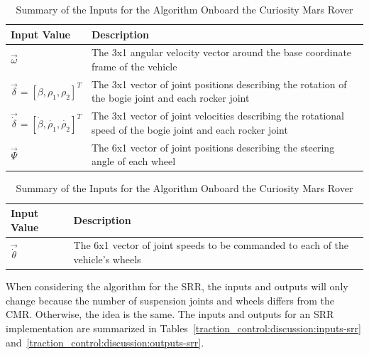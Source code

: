 \begin{table}[H]
	\centering
	\begin{tabular}{| >{\centering\arraybackslash} m{1.2in} | >{\centering\arraybackslash} m{4.5in} |}
		\hline
		\textbf{Input Value} & \textbf{Description} \\
		\hline
		$\vec{\omega}$ & The 3x1 angular velocity vector around the base coordinate frame of the vehicle \\
		\hline
		$\vec{\delta}=\left[\beta, \rho_{1}, \rho_{2}\right]^{T}$ & The 3x1 vector of joint positions describing the rotation of the bogie joint and each rocker joint \\
		\hline
		$\vec{\dot{\delta}}=\left[\dot{\beta}, \dot{\rho_{1}}, \dot{\rho_{2}}\right]^{T}$ & The 3x1 vector of joint velocities describing the rotational speed of the bogie joint and each rocker joint \\
		\hline
		$\vec{\Psi}$ & The 6x1 vector of joint positions describing the steering angle of each wheel \\
		\hline
	\end{tabular}
	\caption{Summary of the Inputs for the Algorithm Onboard the Curiosity Mars Rover}
	\label{traction_control:discussion:inputs-cmr}
\end{table}

\begin{table}[H]
	\centering
	\begin{tabular}{| >{\centering\arraybackslash} m{1.2in} | >{\centering\arraybackslash} m{4.5in} |}
		\hline
		\textbf{Input Value} & \textbf{Description} \\
		\hline
		$\vec{\dot{\theta}}$ & The 6x1 vector of joint speeds to be commanded to each of the vehicle's wheels \\
		\hline
	\end{tabular}
	\caption{Summary of the Inputs for the Algorithm Onboard the Curiosity Mars Rover}
	\label{traction_control:discussion:outputs-cmr}
\end{table}

When considering the algorithm for the \ac{SRR}, the inputs and outputs will only change because the number of suspension joints and wheels differs from the \ac{CMR}. Otherwise, the idea is the same. The inputs and outputs for an \ac{SRR} implementation are summarized in Tables~\ref{traction_control:discussion:inputs-srr} and~\ref{traction_control:discussion:outputs-srr}.

